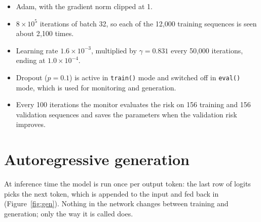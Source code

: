 \documentclass[11pt]{article}
\newcommand{\code}[1]{\texttt{#1}}
\begin{document}
\begin{itemize}
\item Adam, with the gradient norm clipped at 1.
\item $8\times10^5$ iterations of batch 32, so each of the 12{,}000 training sequences is
  seen about 2{,}100 times.
\item Learning rate $1.6\times10^{-3}$, multiplied by $\gamma=0.831$ every 50{,}000
  iterations, ending at $1.0\times10^{-4}$.
\item Dropout ($p=0.1$) is active in \code{train()} mode and switched off in
  \code{eval()} mode, which is used for monitoring and generation.
\item Every 100 iterations the monitor evaluates the risk on 156 training and 156
  validation sequences and saves the parameters when the validation risk improves.
\end{itemize}

\section{Autoregressive generation}
\label{sec:generation}

At inference time the model is run once per output token: the last row of logits picks
the next token, which is appended to the input and fed back in (Figure~\ref{fig:gen}).
Nothing in the network changes between training and generation; only the way it is
called does.
\end{document}
